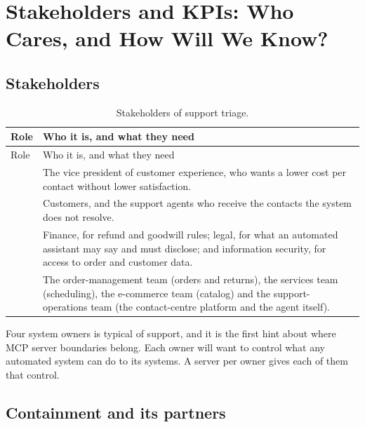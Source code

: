 \section{Stakeholders and KPIs: Who Cares, and How Will We Know?}
\label{sec:support-kpis}

\subsection{Stakeholders}

\begingroup
\small
\begin{xltabular}{\textwidth}{@{}>{\raggedright\arraybackslash}p{2.0cm}>{\raggedright\arraybackslash}X@{}}
\caption{Stakeholders of support triage.}\label{tab:support-stakeholders}\\
\toprule
{} Role & Who it is, and what they need \\
\midrule
\endfirsthead
\toprule
{} Role & Who it is, and what they need \\
\midrule
\endhead
{} & The vice president of customer experience, who wants a lower cost per contact without lower satisfaction. \\
 & Customers, and the support agents who receive the contacts the system does not resolve. \\
 & Finance, for refund and goodwill rules; legal, for what an automated assistant may say and must disclose; and information security, for access to order and customer data. \\
 & The order-management team (orders and returns), the services team (scheduling), the e-commerce team (catalog) and the support-operations team (the contact-centre platform and the agent itself). \\
\bottomrule
\end{xltabular}
\endgroup

Four system owners is typical of support, and it is the first hint about where MCP server boundaries belong. Each owner will want to control what any automated system can do to its systems. A server per owner gives each of them that control.

\subsection{Containment and its partners}

